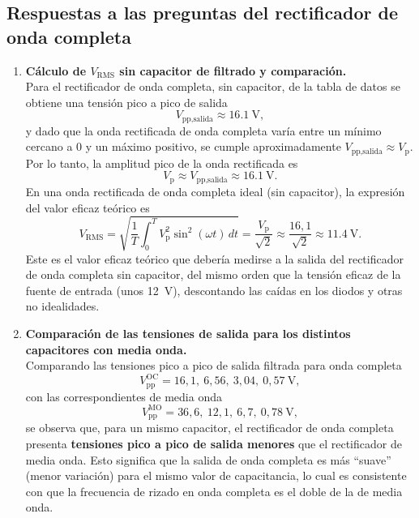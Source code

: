\documentclass[a4paper,12pt]{article}
\begin{document}
\subsection{Respuestas a las preguntas del rectificador de onda completa}

\begin{enumerate}
    \item \textbf{Cálculo de \(V_{\text{RMS}}\) sin capacitor de filtrado y comparación.}\\[4pt]
    Para el rectificador de onda completa, sin capacitor, de la tabla de datos se obtiene una tensión pico a pico de salida
    \[
        V_{\text{pp,salida}} \approx \SI{16,1}{\volt},
    \]
    y dado que la onda rectificada de onda completa varía entre un mínimo cercano a 0 y un máximo positivo, se cumple aproximadamente \(V_{\text{pp,salida}} \approx V_{\text{p}}\). Por lo tanto, la amplitud pico de la onda rectificada es
    \[
        V_{\text{p}} \approx V_{\text{pp,salida}} \approx \SI{16,1}{\volt}.
    \]
    En una onda rectificada de onda completa ideal (sin capacitor), la expresión del valor eficaz teórico es
    \[
        V_{\text{RMS}} = \sqrt{\frac{1}{T}\int_0^{T} V_{\text{p}}^{2} \sin^{2}(\omega t)\, dt}
                      = \frac{V_{\text{p}}}{\sqrt{2}}
        \approx \frac{16{,}1}{\sqrt{2}} \approx \SI{11,4}{\volt}.
    \]
    Este es el valor eficaz teórico que debería medirse a la salida del rectificador de onda completa sin capacitor, del mismo orden que la tensión eficaz de la fuente de entrada (unos \SI{12}{\volt}), descontando las caídas en los diodos y otras no idealidades.

    \item \textbf{Comparación de las tensiones de salida para los distintos capacitores con media onda.}\\[4pt]
    Comparando las tensiones pico a pico de salida filtrada para onda completa
    \[
        V_{\text{pp}}^{\text{OC}} = 16{,}1,\ 6{,}56,\ 3{,}04,\ 0{,}57\ \text{V},
    \]
    con las correspondientes de media onda
    \[
        V_{\text{pp}}^{\text{MO}} = 36{,}6,\ 12{,}1,\ 6{,}7,\ 0{,}78\ \text{V},
    \]
    se observa que, para un mismo capacitor, el rectificador de onda completa presenta \textbf{tensiones pico a pico de salida menores} que el rectificador de media onda. Esto significa que la salida de onda completa es más “suave” (menor variación) para el mismo valor de capacitancia, lo cual es consistente con que la frecuencia de rizado en onda completa es el doble de la de media onda.


\end{enumerate}
\end{document}
